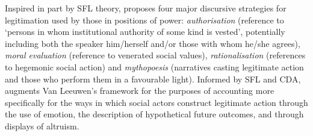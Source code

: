 Inspired in part by \gls{SFL} theory, \textcite[p.~92]{van_leeuwen_legitimation_2007} proposes four major discursive strategies for legitimation used by those in positions of power: \emph{authorisation} (reference to `persons in whom institutional authority of some kind is vested', potentially including both the speaker him\slash herself and\slash or those with whom he\slash she agrees), \emph{moral evaluation} (reference to venerated social values), \emph{rationalisation} (references to hegemonic social action) and \emph{mythopoesis} (narratives casting legitimate action and those who perform them in a favourable light). Informed by \gls{SFL} and \gls{CDA}, \textcite{reyes_strategies_2011} augments Van Leeuwen's framework for the purposes of accounting more specifically for the ways in which social actors construct legitimate action through the use of emotion, the description of hypothetical future outcomes, and through displays of altruism. %


